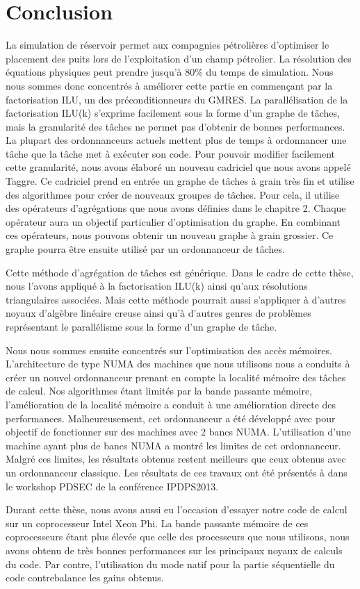 \section{Conclusion}
La simulation de réservoir permet aux compagnies pétrolières d'optimiser le placement des puits lors de l'exploitation d'un champ pétrolier.
%
La résolution des équations physiques peut prendre jusqu'à 80\% du temps de simulation.
%
Nous nous sommes donc concentrés à améliorer cette partie en commençant par la factorisation ILU, un des préconditionneurs du GMRES.
%
La parallélisation de la factorisation ILU(k) s'exprime facilement sous la forme d'un graphe de tâches, mais la granularité des tâches ne permet pas d'obtenir de bonnes performances.
%
La plupart des ordonnanceurs actuels mettent plus de temps à ordonnancer une tâche que la tâche met à exécuter son code.
%
Pour pouvoir modifier facilement cette granularité, nous avons élaboré un nouveau cadriciel que nous avons appelé Taggre.
%
Ce cadriciel prend en entrée un graphe de tâches à grain très fin et utilise des algorithmes pour créer de nouveaux groupes de tâches.
%
Pour cela, il utilise des opérateurs d'agrégations que nous avons définies dans le chapitre 2.
%
Chaque opérateur aura un objectif particulier d'optimisation du graphe.
%
En combinant ces opérateurs, nous pouvons obtenir un nouveau graphe à grain grossier.
%
Ce graphe pourra être ensuite utilisé par un ordonnanceur de tâches.

Cette méthode d'agrégation de tâches est générique.
%
Dans le cadre de cette thèse, nous l'avons appliqué à la factorisation ILU(k) ainsi qu'aux résolutions triangulaires associées.
%
Mais cette méthode pourrait aussi s'appliquer à d'autres noyaux d'algèbre linéaire creuse ainsi qu'à d'autres genres de problèmes représentant le parallélisme sous la forme d'un graphe de tâche.

Nous nous sommes ensuite concentrés sur l'optimisation des accès mémoires.
%
L'architecture de type NUMA des machines que nous utilisons nous a conduits à créer un nouvel ordonnanceur prenant en compte la localité mémoire des tâches de calcul.
%
Nos algorithmes étant limités par la bande passante mémoire, l'amélioration de la localité mémoire a conduit à une amélioration directe des performances.
%
Malheureusement, cet ordonnanceur a été développé avec pour objectif de fonctionner sur des machines avec 2 bancs NUMA.
%
L'utilisation d'une machine ayant plus de bancs NUMA a montré les limites de cet ordonnanceur.
%
Malgré ces limites, les résultats obtenus restent meilleurs que ceux obtenus avec un ordonnanceur classique.
%
Les résultats de ces travaux ont été présentés à dans le workshop PDSEC de la conférence IPDPS2013.

Durant cette thèse, nous avons aussi eu l'occasion d'essayer notre code de calcul sur un coprocesseur Intel Xeon Phi.
%
La bande passante mémoire de ces coprocesseurs étant plus élevée que celle des processeurs que nous utilisons, nous avons obtenu de très bonnes performances sur les principaux noyaux de calculs du code.
%
Par contre, l'utilisation du mode natif pour la partie séquentielle du code contrebalance les gains obtenus.
